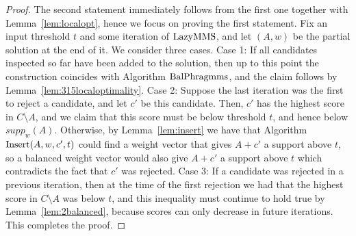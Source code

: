 \begin{proof}
The second statement immediately follows from the first one together with Lemma~\ref{lem:localopt}, hence we focus on proving the first statement. 
Fix an input threshold $t$ and some iteration of $\operatorname{LazyMMS}$, and let $(A,w)$ be the partial solution at the end of it. 
We consider three cases. Case 1: If all candidates inspected so far have been added to the solution, then up to this point the construction coincides with Algorithm $\operatorname{BalPhragmms}$, and the claim follows by Lemma~\ref{lem:315localoptimality}. 
Case 2: Suppose the last iteration was the first to reject a candidate, and let $c'$ be this candidate. Then, $c'$ has the highest score in $C\setminus A$, and we claim that this score must be below threshold $t$, and hence below $supp_w(A)$. Otherwise, by Lemma~\ref{lem:insert} we have that Algorithm $\operatorname{Insert}(A,w,c',t)$ could find a weight vector that gives $A+c'$ a support above $t$, so a balanced weight vector would also give $A+c'$ a support above $t$ which contradicts the fact that $c'$ was rejected. 
Case 3: If a candidate was rejected in a previous iteration, then at the time of the first rejection we had that the highest score in $C\setminus A$ was below $t$, and this inequality must continue to hold true by Lemma~\ref{lem:2balanced}, because scores can only decrease in future iterations. This completes the proof.
\end{proof}